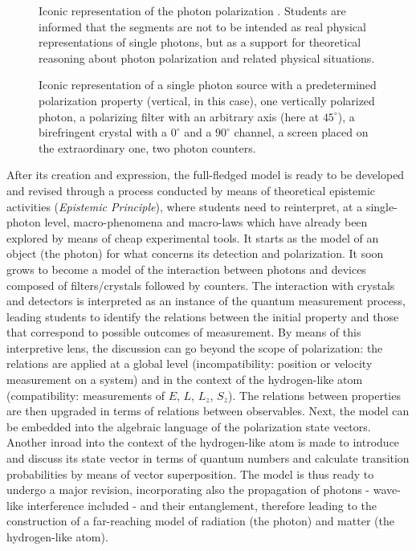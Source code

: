 \documentclass[twocolumn,secnumarabic,amssymb, nobibnotes, aps, prd, nofootinbib]{revtex4-2}
\begin{document}
\begin{enumerate}[1.]
\begin{figure}[!ht]
    \centering  %
    \caption{Iconic representation of the photon polarization \protect\cite{Michelini2002}. Students are informed that the segments are not to be intended as real physical representations of single photons, but as a support for theoretical reasoning about photon polarization and related physical situations.}
    \label{FIG:4}
\end{figure}
\begin{figure}[!ht]
    \centering  %
    \caption{Iconic representation of a single photon source with a predetermined polarization property (vertical, in this case), one vertically polarized photon, a polarizing filter with an arbitrary axis (here at $45^{\circ}$), a birefringent crystal with a $0^{\circ}$ and a $90^{\circ}$ channel, a screen placed on the extraordinary one, two photon counters.}
    \label{FIG:5}
\end{figure}
\end{enumerate}

After its creation and expression, the full-fledged model is ready to be developed and revised through a process conducted by means of theoretical epistemic activities (\textit{Epistemic Principle}), where students need to reinterpret, at a single-photon level, macro-phenomena and macro-laws which have already been explored by means of cheap experimental tools. It starts as the model of an object (the photon) for what concerns its detection and polarization. It soon grows to become a model of the interaction between photons and devices composed of filters/crystals followed by counters. The interaction with crystals and detectors is interpreted as an instance of the quantum measurement process, leading students to identify the relations between the initial property and those that correspond to possible outcomes of measurement. By means of this interpretive lens, the discussion can go beyond the scope of polarization: the relations are applied at a global level (incompatibility: position or velocity measurement on a system) and in the context of the hydrogen-like atom (compatibility: measurements of $E$, $L$, $L_z$, $S_z$). The relations between properties are then upgraded in terms of relations between observables. Next, the model can be embedded into the algebraic language of the polarization state vectors. Another inroad into the context of the hydrogen-like atom is made to introduce and discuss its state vector in terms of quantum numbers and calculate transition probabilities by means of vector superposition. The model is thus ready to undergo a major revision, incorporating also the propagation of photons - wave-like interference included - and their entanglement, therefore leading to the construction of a far-reaching model of radiation (the photon) and matter (the hydrogen-like atom).
\end{document}
